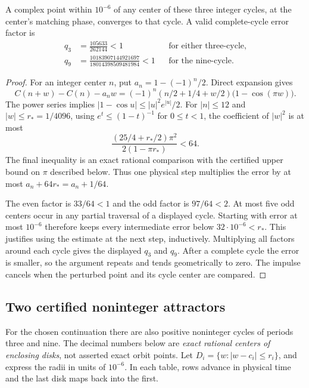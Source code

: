 \begin{proposition}
\label{prop:integer-capture-disks}
A complex point within $10^{-6}$ of any center of these three
integer cycles, at the center's matching phase, converges to that
cycle. A valid complete-cycle error factor is
\begin{align*}
 q_3&=\frac{105633}{262144}<1
 &&\text{for either three-cycle},\\
 q_9&=\frac{10183907144921697}{18014398509481984}<1
 &&\text{for the nine-cycle}.
\end{align*}
\end{proposition}
\begin{proof}
For an integer center $n$, put $a_n=1-(-1)^n/2$. Direct expansion gives
\[
 C(n+w)-C(n)-a_nw
 =(-1)^n(n/2+1/4+w/2)\bigl(1-\cos(\pi w)\bigr).
\]
The power series implies
$|1-\cos u|\le |u|^2e^{|u|}/2$. For $|n|\le12$ and
$|w|\le r_*=1/4096$, using $e^t\le(1-t)^{-1}$ for $0\le t<1$,
the coefficient of $|w|^2$ is at most
\[
 \frac{(25/4+r_*/2)\pi^2}{2(1-\pi r_*)}<64.
\]
The final inequality is an exact rational comparison with the certified
upper bound on $\pi$ described below. Thus one physical step multiplies
the error by at most $a_n+64r_*=a_n+1/64$.

The even factor is $33/64<1$ and the odd factor is $97/64<2$.
At most five odd centers occur in any partial traversal of a displayed
cycle. Starting with error at most $10^{-6}$ therefore keeps every
intermediate error below $32\cdot10^{-6}<r_*$. This justifies using
the estimate at the next step, inductively. Multiplying all factors
around each cycle gives the displayed $q_3$ and $q_9$. After a complete
cycle the error is smaller, so the argument repeats and tends
geometrically to zero. The impulse cancels when the perturbed point
and its cycle center are compared.
\end{proof}

\subsection{Two certified noninteger attractors}

For the chosen continuation there are also positive noninteger cycles
of periods three and nine. The decimal numbers below are \emph{exact
rational centers of enclosing disks}, not asserted exact orbit points.
Let $D_i=\{w:|w-c_i|\le r_i\}$, and express the radii in units of
$10^{-6}$. In each table, rows advance in physical time and the last
disk maps back into the first.

